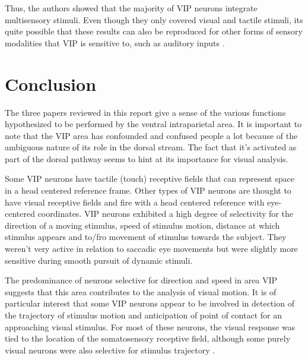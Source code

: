 \documentclass[10pt,oneside,final]{article}
\begin{document}
        Thus, the authors showed that the majority of VIP neurons integrate multisensory stimuli. Even though they only covered visual and tactile stimuli, its quite possible that these results can also be reproduced for other forms of sensory modalities that VIP is sensitive to, such as auditory inputs \cite{Schlack2005}.
    \section{Conclusion}
        The three papers reviewed in this report give a sense of the various functions hypothesized to be performed by the ventral intraparietal area. It is important to note that the VIP area has confounded and confused people a lot because of the ambiguous nature of its role in the dorsal stream. The fact that it's activated as part of the dorsal pathway seems to hint at its importance for visual analysis.

        Some VIP neurons have tactile (touch) receptive fields that can represent space in a head centered reference frame. Other types of VIP neurons are thought to have visual receptive fields and fire with a head centered reference with eye-centered coordinates. VIP neurons exhibited a high degree of selectivity for the direction of a moving stimulus, speed of stimulus motion, distance at which stimulus appears and to/fro movement of stimulus towards the subject. They weren't very active in relation to saccadic eye movements but were slightly more sensitive during smooth pursuit of dynamic stimuli.

        The predominance of neurons selective for direction and speed in area VIP suggests that this area contributes to the analysis of visual motion. It is of particular interest that some VIP neurons appear to be involved in detection of the trajectory of stimulus motion and anticipation of point of contact for an approaching visual stimulus. For most of these neurons, the visual response was tied to the location of the somatosensory receptive field, although some purely visual neurons were also selective for stimulus trajectory \cite{Colby1993}.       



\clearpage


\end{document}
